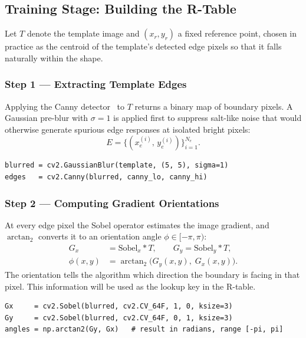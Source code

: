 \documentclass[12pt,a4paper]{article}
\begin{document}
\subsection{Training Stage: Building the R-Table}

Let $T$ denote the template image and $(x_r, y_r)$ a fixed reference point, chosen
in practice as the centroid of the template's detected edge pixels so that it falls
naturally within the shape.

\subsubsection*{Step 1 --- Extracting Template Edges}

Applying the Canny detector~\cite{canny1986} to $T$ returns a binary map of boundary
pixels.  A Gaussian pre-blur with $\sigma = 1$ is applied first to suppress
salt-like noise that would otherwise generate spurious edge responses at isolated
bright pixels:
\begin{equation}
  E = \bigl\{(x_e^{(i)},\, y_e^{(i)})\bigr\}_{i=1}^{N_e}.
\end{equation}

\begin{lstlisting}[caption={Edge extraction from the template image.}]
blurred = cv2.GaussianBlur(template, (5, 5), sigma=1)
edges   = cv2.Canny(blurred, canny_lo, canny_hi)
\end{lstlisting}

\subsubsection*{Step 2 --- Computing Gradient Orientations}

At every edge pixel the Sobel operator estimates the image gradient, and
$\arctan_2$ converts it to an orientation angle $\phi \in [-\pi, \pi)$:
\begin{align}
  G_x &= \text{Sobel}_x * T, \qquad G_y = \text{Sobel}_y * T, \label{eq:sobel}\\
  \phi(x,y) &= \arctan_2\!\bigl(G_y(x,y),\; G_x(x,y)\bigr). \label{eq:phi}
\end{align}
The orientation tells the algorithm which direction the boundary is facing in
that pixel. This information will be used as the lookup key in the R-table.

\begin{lstlisting}[caption={Gradient orientation using Sobel convolution kernels.}]
Gx     = cv2.Sobel(blurred, cv2.CV_64F, 1, 0, ksize=3)
Gy     = cv2.Sobel(blurred, cv2.CV_64F, 0, 1, ksize=3)
angles = np.arctan2(Gy, Gx)   # result in radians, range [-pi, pi]
\end{lstlisting}
\end{document}
